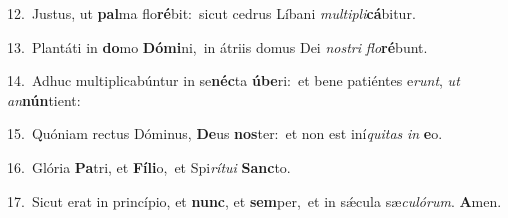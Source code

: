 {\numbfont\textcolor{\numbcolor}{12.}}~Justus, ut \textbf{pal}\-ma flo\-\textbf{ré}\-bit:~\star sicut cedrus Líbani \textit{mul}\-\textit{ti}\textit{pli}\textbf{cá}bitur.\par
{\numbfont\textcolor{\numbcolor}{13.}}~Plantáti in \textbf{do}\-mo \textbf{Dó}\-\textbf{mi}ni,~\star in átriis domus Dei \textit{nos}\-\textit{tri} \textit{flo}\-\textbf{ré}bunt.\par
{\numbfont\textcolor{\numbcolor}{14.}}~Adhuc multiplicabúntur in se\-\textbf{néc}\-ta \textbf{ú}\-\textbf{be}ri:~\star et bene patiéntes e\-\textit{runt}\-, \textit{ut} \textit{an}\-\textbf{nún}tient:\par
{\numbfont\textcolor{\numbcolor}{15.}}~Quóniam rectus Dóminus, \textbf{De}\-us \textbf{nos}\-ter:~\star et non est iní\-\textit{qui}\-\textit{tas} \textit{in} \textbf{e}\-o.\par
{\numbfont\textcolor{\numbcolor}{16.}}~Glória \textbf{Pa}\-tri, et \textbf{Fí}\-\textbf{li}o,~\star et Spi\-\textit{rí}\-\textit{tu}\textit{i} \textbf{Sanc}\-to.\par
{\numbfont\textcolor{\numbcolor}{17.}}~Sicut erat in princípio, et \textbf{nunc}\-, et \textbf{sem}\-per,~\star et in sǽcula sæ\-\textit{cu}\-\textit{ló}\textit{rum}. \textbf{A}\-men.\par
